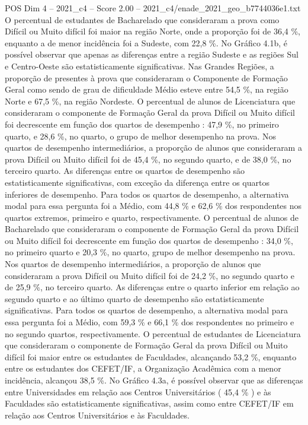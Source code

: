 \begin{textsample}{POS Dim 4 – 2021\_c4 – Score 2.00 – 2021\_c4/enade\_2021\_geo\_b7744036e1.txt}
O percentual de estudantes de Bacharelado que consideraram a prova como Difícil ou Muito difícil foi maior na região Norte, onde a proporção foi de 36,4 \%, enquanto a de menor incidência foi a Sudeste, com 22,8 \%.
No Gráfico 4.1b, é possível observar que apenas as diferenças entre a região Sudeste e as regiões Sul e Centro-Oeste são estatisticamente significativas.
Nas Grandes Regiões, a proporção de presentes à prova que consideraram o Componente de Formação Geral como sendo de grau de dificuldade Médio esteve entre 54,5 \%, na região Norte e 67,5 \%, na região Nordeste.
O percentual de alunos de Licenciatura que consideraram o componente de Formação Geral da prova Difícil ou Muito difícil foi decrescente em função dos quartos de desempenho : 47,9 \%, no primeiro quarto, e 28,6 \%, no quarto, o grupo de melhor desempenho na prova.
Nos quartos de desempenho intermediários, a proporção de alunos que consideraram a prova Difícil ou Muito difícil foi de 45,4 \%, no segundo quarto, e de 38,0 \%, no terceiro quarto.
As diferenças entre os quartos de desempenho são estatisticamente significativas, com exceção da diferença entre os quartos inferiores de desempenho.
Para todos os quartos de desempenho, a alternativa modal para essa pergunta foi a Médio, com 44,8 \% e 62,6 \% dos respondentes nos quartos extremos, primeiro e quarto, respectivamente.
O percentual de alunos de Bacharelado que consideraram o componente de Formação Geral da prova Difícil ou Muito difícil foi decrescente em função dos quartos de desempenho : 34,0 \%, no primeiro quarto e 20,3 \%, no quarto, grupo de melhor desempenho na prova.
Nos quartos de desempenho intermediários, a proporção de alunos que consideraram a prova Difícil ou Muito difícil foi de 24,2 \%, no segundo quarto e de 25,9 \%, no terceiro quarto.
As diferenças entre o quarto inferior em relação ao segundo quarto e ao último quarto de desempenho são estatisticamente significativas.
Para todos os quartos de desempenho, a alternativa modal para essa pergunta foi a Médio, com 59,3 \% e 66,1 \% dos respondentes no primeiro e no segundo quartos, respectivamente.
O percentual de estudantes de Licenciatura que consideraram o componente de Formação Geral da prova Difícil ou Muito difícil foi maior entre os estudantes de Faculdades, alcançando 53,2 \%, enquanto entre os estudantes dos CEFET/IF, a Organização Acadêmica com a menor incidência, alcançou 38,5 \%.
No Gráfico 4.3a, é possível observar que as diferenças entre Universidades em relação aos Centros Universitários ( 45,4 \% ) e às Faculdades são estatisticamente significativas, assim como entre CEFET/IF em relação aos Centros Universitários e às Faculdades.

\end{textsample}

